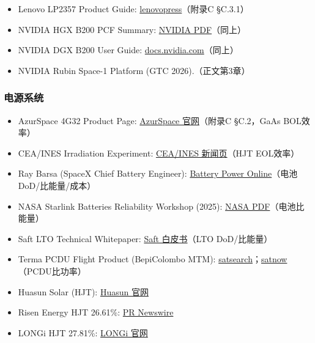 \begin{itemize}
  \item Lenovo LP2357 Product Guide: \href{https://lenovopress.lenovo.com/lp2357-lenovo-nvidia-gb300-nvl72-rack-scale-ai}{lenovopress}（附录C §C.3.1）
  \item NVIDIA HGX B200 PCF Summary: \href{https://images.nvidia.com/aem-dam/Solutions/documents/HGX-B200-PCF-Summary.pdf}{NVIDIA PDF}（同上）
  \item NVIDIA DGX B200 User Guide: \href{https://docs.nvidia.com/dgx/dgxb200-user-guide/introduction-to-dgxb200.html}{docs.nvidia.com}（同上）
  \item NVIDIA Rubin Space-1 Platform (GTC 2026).（正文第3章）
\end{itemize}

\subsubsection{电源系统}

\begin{itemize}
  \item AzurSpace 4G32 Product Page: \href{https://www.azurspace.com/en/products/space-products/}{AzurSpace 官网}（附录C §C.2，GaAs BOL效率）
  \item CEA/INES Irradiation Experiment: \href{https://www.cea.fr/cea-tech/liten/english/Pages/Medias/News/2025/major-breakthrough-for-photovoltaic-technology-space.aspx}{CEA/INES 新闻页}（HJT EOL效率）
  \item Ray Barsa (SpaceX Chief Battery Engineer): \href{https://ciclibattery.com/battery-power-online-space-batteries-how-spacex-designs-batteries-for-satellites/}{Battery Power Online}（电池DoD/比能量/成本）
  \item NASA Starlink Batteries Reliability Workshop (2025): \href{https://www.nasa.gov/wp-content/uploads/2024/01/starlink-batteries-reliability-lessons-from-10000-leo-satellites-abw-2025.pdf}{NASA PDF}（电池比能量）
  \item Saft LTO Technical Whitepaper: \href{https://saft.com/en/horizon-new-lithium-based-technology-satellite-batteries-improving-mission-performance}{Saft 白皮书}（LTO DoD/比能量）
  \item Terma PCDU Flight Product (BepiColombo MTM): \href{https://satsearch.co/products/terma-power-conditioning-distribution-unit}{satsearch}；\href{https://www.satnow.com/products/power-conditioning-and-distribution-units/terma/134-1195-bepicolombo-mtm-pcdu}{satnow}（PCDU比功率）
  \item Huasun Solar (HJT): \href{https://www.huasunsolar.com/}{Huasun 官网}
  \item Risen Energy HJT 26.61\%: \href{https://www.prnewswire.com/news-releases/risen-energy-achieves-26-61-efficiency-for-hjt-solar-cell-302390000.html}{PR Newswire}
  \item LONGi HJT 27.81\%: \href{https://www.longi.com/}{LONGi 官网}
\end{itemize}

